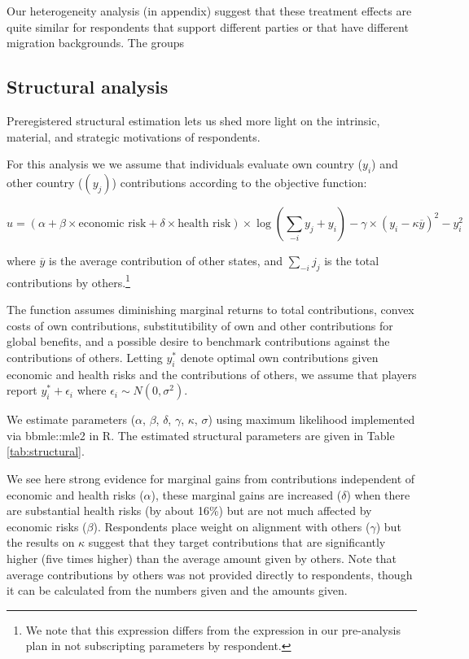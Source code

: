 \documentclass[]{article}
\begin{document}
Our heterogeneity analysis (in appendix) suggest that these treatment effects are quite similar for respondents that support different parties or that have different migration backgrounds. The groups 

\subsection{Structural analysis}

Preregistered structural estimation lets us shed more light on the intrinsic, material, and strategic motivations of respondents.

For this analysis we we assume that individuals evaluate own country ($y_i$) and other country ($(y_j)$) contributions according to the objective function:

$$u =  (\alpha + \beta\times \text{economic risk} + \delta \times \text{health risk})  \times \log \left(\sum_{-i}y_j + y_i \right) - \gamma\times(y_i - \kappa\overline{y})^2 - y_i^2 $$

where $\overline{y}$ is the average contribution of other states, and $\sum_{-i}{j_j}$ is the total contributions by others.\footnote{We note that this expression differs from the expression in our pre-analysis plan in not subscripting parameters by respondent.} 

The function assumes diminishing marginal returns to total contributions, convex costs of own contributions, substitutibility of own and other contributions for global benefits, and a possible desire to benchmark contributions against the contributions of others.  Letting $y_i^*$ denote optimal own contributions given economic and health risks and the contributions of others, we assume that players report $y_i^* + \epsilon_i$ where $\epsilon_i \sim N(0,\sigma^2)$. 

We estimate parameters ($\alpha$, $\beta$, $\delta$, $\gamma$, $\kappa$, $\sigma$) using maximum likelihood implemented via bbmle::mle2 in R. The estimated structural parameters are given in Table \ref{tab:structural}.




We see here strong evidence for marginal gains from contributions independent of economic and health risks ($\alpha$), these marginal gains are increased ($\delta$) when there are substantial health risks (by about 16\%) but are not much affected by economic risks ($\beta$). Respondents place weight on alignment with others ($\gamma$) but the results on $\kappa$ suggest that they target contributions that are significantly higher (five times higher) than the average amount given by others. Note that average contributions by others was not provided directly to respondents, though it can be calculated from the numbers given and the amounts given. 
\end{document}
